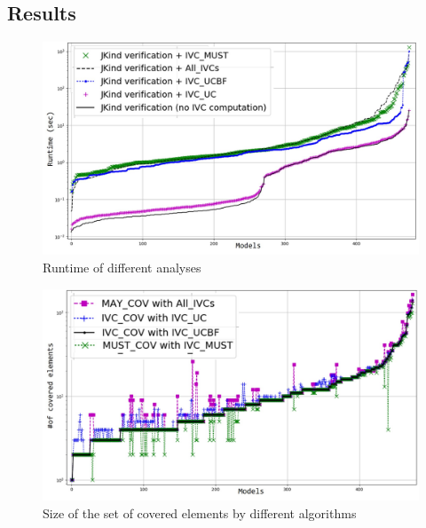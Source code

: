 \subsection{Results}
\label{sec:results}

\newcommand{\takeaway}[1]{
\vspace{6pt}
\noindent\fbox{\parbox{0.98\columnwidth}{#1}}
\vspace{6pt}
}

\begin{figure}
  \centering
  \includegraphics[width=\columnwidth]{figs/timing_analyses_all_sorted.jpg}
  \vspace{-0.1in}
  \caption{Runtime of different analyses}\label{fig:runtimeall}
\end{figure}

\begin{figure}
  \centering
  \includegraphics[width=\columnwidth]{figs/size.jpg}
  \vspace{-0.1in}
  \caption{Size of the set of covered elements by different algorithms}\label{fig:size}
\end{figure}

